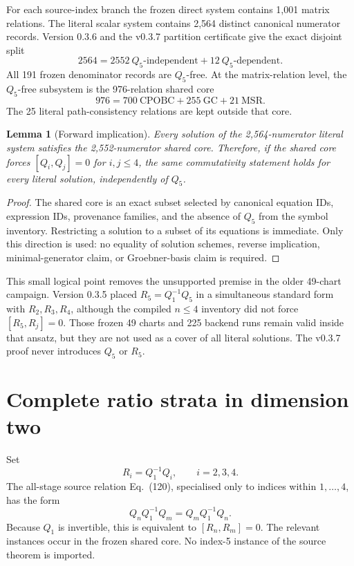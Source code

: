 \documentclass[11pt]{article}
\newtheorem{lemma}{Lemma}
\theoremstyle{remark}
\theoremstyle{plain}
\newcommand{\Cpobc}{\mathrm{CPOBC}}
\begin{document}
For each source-index branch the frozen direct system contains 1,001
matrix relations.  The literal scalar system contains 2,564 distinct
canonical numerator records.  Version 0.3.6 and the v0.3.7 partition
certificate give the exact disjoint split
\[
  2564 = 2552\ \text{\(Q_5\)-independent}
       + 12\ \text{\(Q_5\)-dependent}.
\]
All 191 frozen denominator records are \(Q_5\)-free.  At the matrix-relation
level, the \(Q_5\)-free subsystem is the 976-relation shared core
\[
  976 = 700\ \Cpobc + 255\ \mathrm{GC} + 21\ \mathrm{MSR}.
\]
The 25 literal path-consistency relations are kept outside that core.

\begin{lemma}[Forward implication]
\label{lem:forward}
Every solution of the 2,564-numerator literal system satisfies the
2,552-numerator shared core.  Therefore, if the shared core forces
\([Q_i,Q_j]=0\) for \(i,j\leq4\), the same commutativity statement holds
for every literal solution, independently of \(Q_5\).
\end{lemma}

\begin{proof}
The shared core is an exact subset selected by canonical equation IDs,
expression IDs, provenance families, and the absence of \(Q_5\) from the
symbol inventory.  Restricting a solution to a subset of its equations is
immediate.  Only this direction is used: no equality of solution schemes,
reverse implication, minimal-generator claim, or Groebner-basis claim is
required.
\end{proof}

This small logical point removes the unsupported premise in the older
49-chart campaign.  Version 0.3.5 placed \(R_5=Q_1^{-1}Q_5\) in a
simultaneous standard form with \(R_2,R_3,R_4\), although the compiled
\(n\leq4\) inventory did not force \([R_5,R_j]=0\).  Those frozen 49
charts and 225 backend runs remain valid inside that ansatz, but they are
not used as a cover of all literal solutions.  The v0.3.7 proof never
introduces \(Q_5\) or \(R_5\).

\section{Complete ratio strata in dimension two}

Set
\[
  R_i=Q_1^{-1}Q_i,\qquad i=2,3,4.
\]
The all-stage source relation Eq.\ (120), specialised only to indices
within \(1,\ldots,4\), has the form
\[
  Q_nQ_1^{-1}Q_m=Q_mQ_1^{-1}Q_n .
\]
Because \(Q_1\) is invertible, this is equivalent to
\([R_n,R_m]=0\).  The relevant instances occur in the frozen shared core.
No index-5 instance of the source theorem is imported.
\end{document}
